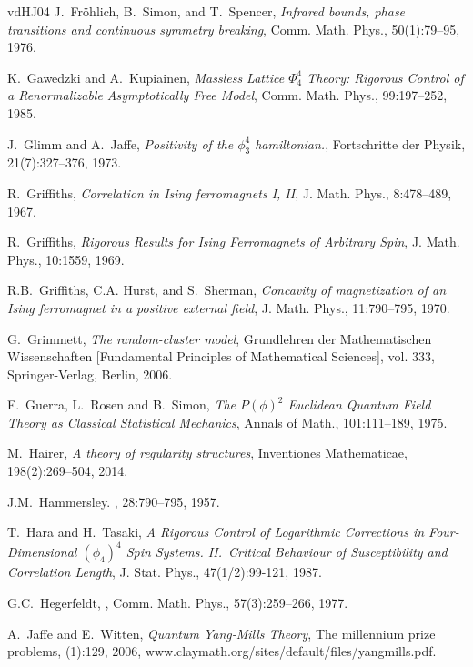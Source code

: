 \documentclass[a4paper,oneside,11pt]{article}
\numberwithin{equation}{section}
\numberwithin{equation}{section}
\numberwithin{equation}{section}
\begin{document}
\begin{thebibliography}{vdHJ04}
J.~Fr{{\"o}}hlich, B.~Simon, and T.~Spencer, \emph{Infrared bounds, phase
  transitions and continuous symmetry breaking},   Comm. Math. Phys., 50(1):79--95, 1976. 

K.~Gawedzki and A.~Kupiainen,
{\em Massless Lattice $\Phi_4^4$ Theory: Rigorous Control of a Renormalizable Asymptotically Free Model},
  Comm. Math. Phys., 99:197--252, 1985.

J.~Glimm and A.~Jaffe, \emph{Positivity of the $\phi_3^4$ hamiltonian.},
  Fortschritte der Physik, 21(7):327--376, 1973.

R.~Griffiths, {\em Correlation in {I}sing ferromagnets {I}, {II}}, J. Math. Phys., 8:478--489, 1967.

R.~Griffiths, {\em Rigorous Results for Ising Ferromagnets of Arbitrary Spin},
J. Math. Phys., 10:1559, 1969.

R.B.~Griffiths, C.A. Hurst, and S.~Sherman, \emph{Concavity of
  magnetization of an {I}sing ferromagnet in a positive external field}, J.
  Math. Phys., 11:790--795, 1970. 

G.~Grimmett, \emph{The random-cluster model}, Grundlehren der Mathematischen
  Wissenschaften [Fundamental Principles of Mathematical Sciences], vol. 333,
  Springer-Verlag, Berlin, 2006. 
  
 F.~Guerra, L.~Rosen and B.~Simon, \emph{The $P(\phi)^2$ Euclidean Quantum Field Theory as Classical Statistical Mechanics}, 
Annals of Math., 101:111--189, 1975. 

M.~Hairer,
{\em A theory of regularity structures}, 
Inventiones Mathematicae, 198(2):269--504, 2014.

J.M.~Hammersley.
, 28:790--795, 1957.

T.~Hara  and H.~Tasaki, 
{\em A Rigorous Control of Logarithmic Corrections in Four-Dimensional $(\phi_4)^4$ Spin Systems. II.~Critical Behaviour of Susceptibility and
Correlation Length}, J. Stat. Phys., 47(1/2):99-121, 1987.

    G.C.~Hegerfeldt,
    ,
    \newblock   Comm. Math. Phys., 57(3):259--266,  1977. 
    
  A.~Jaffe and E.~Witten, \emph{Quantum Yang-Mills Theory}, The millennium prize problems, (1):129, 2006, www.claymath.org/sites/default/files/yangmills.pdf.
 

\end{thebibliography}
\end{document}
